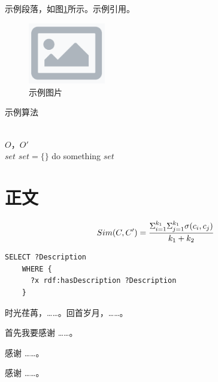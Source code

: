 \documentclass{HDU-Master-Thesis}
\begin{document}
示例段落，如图\ref{fig:1}所示。示例引用\cite{levenshtein1966binary}。


\begin{figure}[!ht]
	\centering
	  \includegraphics[width=0.3\textwidth]{missing}
	  \caption{示例图片}\label{fig:1}
\end{figure}


\renewcommand{\algorithmicrequire}{ \textbf{输入：}}
\renewcommand{\algorithmicensure}{ \textbf{输出：}}
\begin{algorithm}
  \caption{示例算法}\label{alg:1}
  \begin{algorithmic}[1]
    \REQUIRE ~~\\
    $O$，$O'$
    \ENSURE ~~\\
    $set$
    \STATE $set = \{\}$
    \STATE do something
    \ENDIF
    \ENDFOR
    \RETURN $set$
  \end{algorithmic}
\end{algorithm}


\clearpage
\section{正文}

\begin{dmath}\label{eq:1}
  Sim(C, C') = {\Sigma_{i=1}^{k_1}\Sigma_{j=1}^{k_1}\sigma(c_i, c_j) \over k_1 + k_2}
\end{dmath}


\begin{lstlisting}[autogobble, language=SPARQL, caption=示例代码, label=code:feature]
    SELECT ?Description
    WHERE {
      ?x rdf:hasDescription ?Description
    }
\end{lstlisting}


\clearpage
\printbibliography[heading=bibintoc]

\clearpage
{}

\begin{refsection}
  \nocite{self}
  \printbibliography[
    heading=bibintoc,
    title={作者在读期间发表的学术论文及参加的科研项目},
  ]
\end{refsection}

\clearpage
{}

时光荏苒，……。回首岁月，……。

首先我要感谢 ……。

感谢 ……。

感谢 ……。
\end{document}
